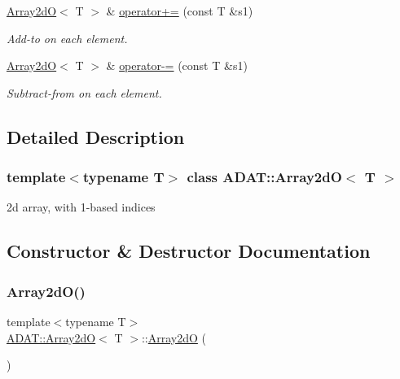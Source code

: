 \begin{DoxyCompactItemize}
\mbox{\hyperlink{classADAT_1_1Array2dO}{Array2dO}}$<$ T $>$ \& \mbox{\hyperlink{classADAT_1_1Array2dO_ae36484e0516c671683a97079f32bd6d8}{operator+=}} (const T \&s1)
\begin{DoxyCompactList}\small\item\em Add-\/to on each element. \end{DoxyCompactList}\item 
\mbox{\hyperlink{classADAT_1_1Array2dO}{Array2dO}}$<$ T $>$ \& \mbox{\hyperlink{classADAT_1_1Array2dO_a5facf357c8c8f28555fe851dce2d039c}{operator-\/=}} (const T \&s1)
\begin{DoxyCompactList}\small\item\em Subtract-\/from on each element. \end{DoxyCompactList}\end{DoxyCompactItemize}


\subsection{Detailed Description}
\subsubsection*{template$<$typename T$>$\newline
class A\+D\+A\+T\+::\+Array2d\+O$<$ T $>$}

2d array, with 1-\/based indices 

\subsection{Constructor \& Destructor Documentation}
\mbox{\label{classADAT_1_1Array2dO_ad54b38527daf48956f3de486768f11b0}} 
\subsubsection{\texorpdfstring{Array2dO()}{Array2dO()}\hspace{0.1cm}{\footnotesize\ttfamily [1/12]}}
{\footnotesize\ttfamily template$<$typename T$>$ \\
\mbox{\hyperlink{classADAT_1_1Array2dO}{A\+D\+A\+T\+::\+Array2dO}}$<$ T $>$\+::\mbox{\hyperlink{classADAT_1_1Array2dO}{Array2dO}} (\begin{DoxyParamCaption}{ }\end{DoxyParamCaption})\hspace{0.3cm}{\ttfamily [inline]}}

